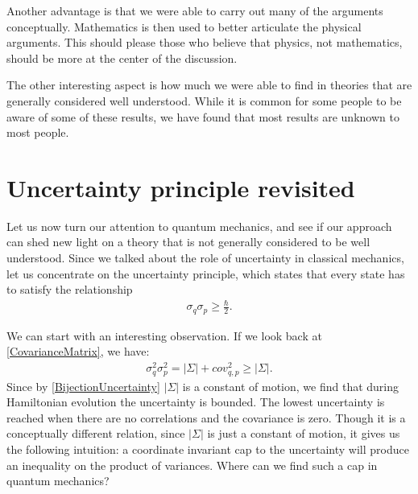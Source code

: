 \documentclass[10pt,twocolumn, nofootinbib]{revtex4-2}
\begin{document}
Another advantage is that we were able to carry out many of the arguments conceptually. Mathematics is then used to better articulate the physical arguments. This should please those who believe that physics, not mathematics, should be more at the center of the discussion.\cite{hossenfelder2018lost, woit2006not}

The other interesting aspect is how much we were able to find in theories that are generally considered well understood. While it is common for some people to be aware of some of these results, we have found that most results are unknown to most people.

\section{Uncertainty principle revisited}


Let us now turn our attention to quantum mechanics, and see if our approach can shed new light on a theory that is not generally considered to be well understood. Since we talked about the role of uncertainty in classical mechanics, let us concentrate on the uncertainty principle, which states that every state has to satisfy the relationship
\begin{align}\label{UncertaintyPrinciple}
	\sigma_q \sigma_p \geq \frac{\hbar}{2}.
\end{align}

We can start with an interesting observation. If we look back at \eqref{CovarianceMatrix}, we have:
\begin{align}
	\sigma_q^2 \sigma_p^2 = |\Sigma| + cov_{q,p}^2 \geq |\Sigma|.
\end{align}
Since by \eqref{BijectionUncertainty} $|\Sigma|$ is a constant of motion, we find that during Hamiltonian evolution the uncertainty is bounded. The lowest uncertainty is reached when there are no correlations and the covariance is zero. Though it is a conceptually different relation, since $|\Sigma|$ is just a constant of motion, it gives us the following intuition: a coordinate invariant cap to the uncertainty will produce an inequality on the product of variances. Where can we find such a cap in quantum mechanics?
\end{document}
